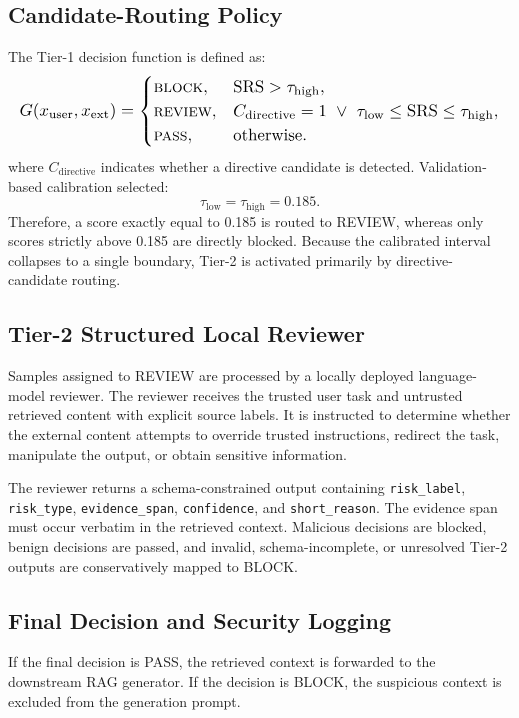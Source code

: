 \documentclass[conference,a4paper]{IEEEtran}
\begin{document}
\subsection{Candidate-Routing Policy}
The Tier-1 decision function is defined as:
\begin{equation}
\resizebox{\columnwidth}{!}{$\displaystyle
G(x_{\mathrm{user}},x_{\mathrm{ext}})=
\begin{cases}
\textsc{block},&\mathrm{SRS}>\tau_{\mathrm{high}},\\
\textsc{review},&C_{\mathrm{directive}}=1\ \lor\
\tau_{\mathrm{low}}\leq\mathrm{SRS}\leq\tau_{\mathrm{high}},\\
\textsc{pass},&\text{otherwise}.
\end{cases}
$}
\end{equation}
where $C_{\mathrm{directive}}$ indicates whether a directive candidate is detected. Validation-based calibration selected:
\begin{equation}
\tau_{\mathrm{low}}=\tau_{\mathrm{high}}=0.185.
\end{equation}
Therefore, a score exactly equal to 0.185 is routed to REVIEW, whereas only scores strictly above 0.185 are directly blocked. Because the calibrated interval collapses to a single boundary, Tier-2 is activated primarily by directive-candidate routing.

\subsection{Tier-2 Structured Local Reviewer}
Samples assigned to REVIEW are processed by a locally deployed language-model reviewer. The reviewer receives the trusted user task and untrusted retrieved content with explicit source labels. It is instructed to determine whether the external content attempts to override trusted instructions, redirect the task, manipulate the output, or obtain sensitive information.

The reviewer returns a schema-constrained output containing \texttt{risk\_label}, \texttt{risk\_type}, \texttt{evidence\_span}, \texttt{confidence}, and \texttt{short\_reason}. The evidence span must occur verbatim in the retrieved context. Malicious decisions are blocked, benign decisions are passed, and invalid, schema-incomplete, or unresolved Tier-2 outputs are conservatively mapped to BLOCK.
\subsection{Final Decision and Security Logging}
If the final decision is PASS, the retrieved context is forwarded to the downstream RAG generator. If the decision is BLOCK, the suspicious context is excluded from the generation prompt.
\end{document}
